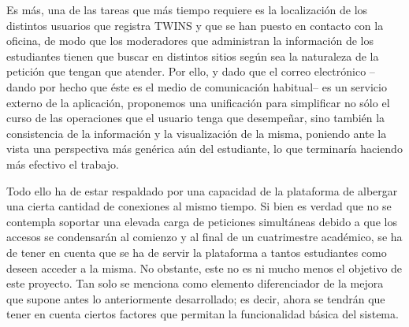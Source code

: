 Es más, una de las tareas que más tiempo requiere es la localización de los distintos usuarios que registra TWINS y que se han puesto en contacto con la oficina, de modo que los moderadores que administran la información de los estudiantes tienen que buscar en distintos sitios según sea la naturaleza de la petición que tengan que atender. Por ello, y dado que el correo electrónico --dando por hecho que éste es el medio de comunicación habitual-- es un servicio externo de la aplicación, proponemos una unificación para simplificar no sólo el curso de las operaciones que el usuario tenga que desempeñar, sino  también la consistencia de la información y la visualización de la misma, poniendo ante la vista una perspectiva más genérica aún del estudiante, lo que terminaría haciendo más efectivo el trabajo.

Todo ello ha de estar respaldado por una capacidad de la plataforma de albergar una cierta cantidad de conexiones al mismo tiempo. Si bien es verdad que no se contempla soportar una elevada carga de peticiones simultáneas debido a que los accesos se condensarán al comienzo y al final de un cuatrimestre académico, se ha de tener en cuenta que se ha de servir la plataforma a tantos estudiantes como deseen acceder a la misma. No obstante, este no es ni mucho menos el objetivo de este proyecto. Tan solo se menciona como elemento diferenciador de la mejora que supone antes lo anteriormente desarrollado; es decir, ahora se tendrán que tener en cuenta ciertos factores que permitan la funcionalidad básica del sistema.